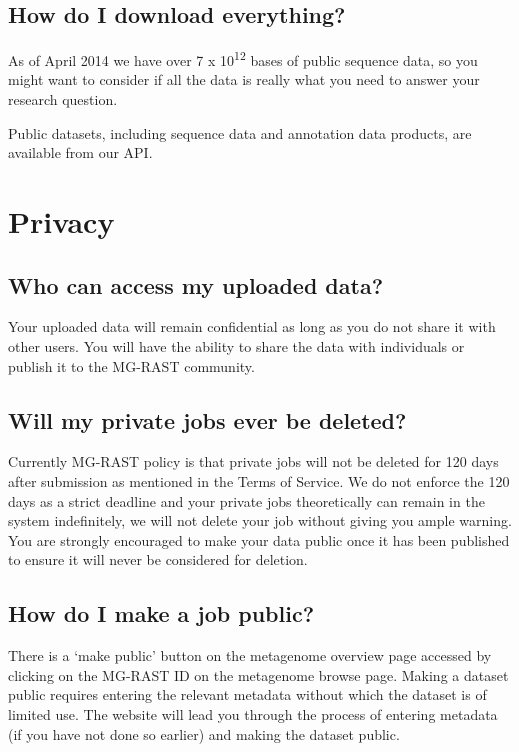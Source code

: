 \documentclass[12pt,fullpage]{report}
\begin{document}
\subsection*{How do I download everything?}
As of April 2014 we have over 7 x 10\textsuperscript{12}  bases of public sequence data, so you might want to consider if all the data is really what you need to answer your research question.

Public datasets, including sequence data and annotation data products, are available from our API.

\noindent

\section{Privacy}
\subsection*{Who can access my uploaded data?}
Your uploaded data will remain confidential as long as you do not share it with other users. You will have the ability to share the data with individuals or publish it to the MG-RAST community.
\subsection*{Will my private jobs ever be deleted?}
Currently MG-RAST policy is that private jobs will not be deleted for 120 days after submission as mentioned in the Terms of Service.
We do not enforce the 120 days as a strict deadline and your private jobs theoretically can remain in the system indefinitely, we will not delete your job without giving you ample warning.
You are strongly encouraged to make your data public once it has been published to ensure it will never be considered for deletion.
\subsection*{How do I make a job public?}
There is a `make public' button on the metagenome overview page accessed by clicking on the MG-RAST ID on the metagenome browse page. Making a dataset public requires entering the relevant metadata without which the dataset is of limited use. The website will lead you through the process of entering metadata (if you have not done so earlier) and making the dataset public.
\end{document}

